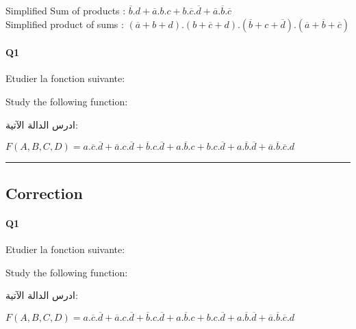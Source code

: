     Simplified Sum of products : $ \overline{b}.d + \overline{a}.b.c + b.\overline{c}.\overline{d} + \overline{a}.\overline{b}.\overline{c} $\\
    Simplified product of sums : $(\overline{a}+b+d).(b+\overline{c}+d).(\overline{b}+c+\overline{d}).(\overline{a}+\overline{b}+\overline{c})$


 
\pagebreak

\paragraph{Q1}



Etudier la fonction suivante:



Study the following function:

\begin{arab}[utf]
ادرس الدالة الآتية:
\end{arab}
$F(A,B,C,D) = a.\overline{c}.\overline{d} + \overline{a}.c.\overline{d} + \overline{b}.c.\overline{d}  +  a.\overline{b}.c + b.c.\overline{d} + a.\overline{b}.\overline{d} + \overline{a}.\overline{b}.\overline{c}.d $



 




\hrule width 1\linewidth
\pagebreak

\subsection{Correction}


\paragraph{Q1}



Etudier la fonction suivante:



Study the following function:

\begin{arab}[utf]
ادرس الدالة الآتية:
\end{arab}
$F(A,B,C,D) = a.\overline{c}.\overline{d} + \overline{a}.c.\overline{d} + \overline{b}.c.\overline{d}  +  a.\overline{b}.c + b.c.\overline{d} + a.\overline{b}.\overline{d} + \overline{a}.\overline{b}.\overline{c}.d $





